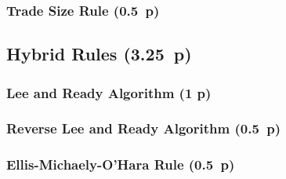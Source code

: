 \subsubsection{Trade Size Rule (0.5~p)}\label{trade-size-rule}

\begin{algorithm}

  \caption{$\operatorname{\mathtt{tradesize}}$ \label{alg:tradesize-rule}}


  \BlankLine %

\end{algorithm}


\subsection{Hybrid Rules (3.25~p)}\label{hybrid-rules}

\subsubsection{Lee and Ready Algorithm (1 p)}\label{lee-and-ready-algorithm}

\subsubsection{Reverse Lee and Ready
  Algorithm (0.5~p)}\label{reverse-lee-and-ready-algorithm}

\subsubsection{Ellis-Michaely-O'Hara
  Rule (0.5~p)}\label{ellis-michaely-ohara-rule}

